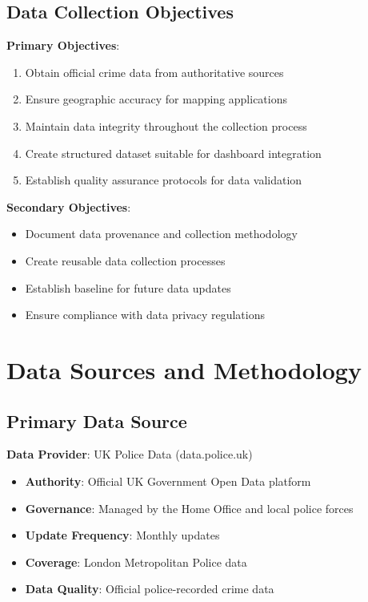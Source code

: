 \documentclass[12pt,a4paper]{article}
\begin{document}
\subsection{Data Collection Objectives}

\textbf{Primary Objectives}:
\begin{enumerate}
    \item Obtain official crime data from authoritative sources
    \item Ensure geographic accuracy for mapping applications
    \item Maintain data integrity throughout the collection process
    \item Create structured dataset suitable for dashboard integration
    \item Establish quality assurance protocols for data validation
\end{enumerate}

\textbf{Secondary Objectives}:
\begin{itemize}
    \item Document data provenance and collection methodology
    \item Create reusable data collection processes
    \item Establish baseline for future data updates
    \item Ensure compliance with data privacy regulations
\end{itemize}

\section{Data Sources and Methodology}

\subsection{Primary Data Source}

\textbf{Data Provider}: UK Police Data (data.police.uk)
\begin{itemize}
    \item \textbf{Authority}: Official UK Government Open Data platform
    \item \textbf{Governance}: Managed by the Home Office and local police forces
    \item \textbf{Update Frequency}: Monthly updates
    \item \textbf{Coverage}: London Metropolitan Police data
    \item \textbf{Data Quality}: Official police-recorded crime data
\end{itemize}
\end{document}
